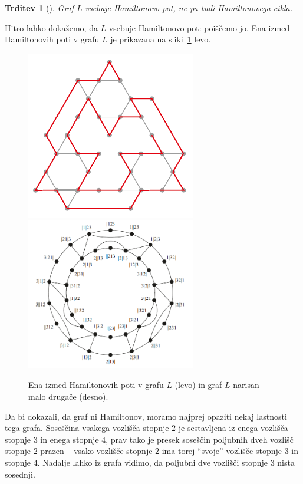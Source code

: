 \documentclass[12pt,a4paper]{amsart}
\theoremstyle{definition} %
\theoremstyle{plain} %
\newtheorem{trditev}[definicija]{Trditev}
\begin{document}
\bigskip

\begin{trditev}[{\cite[Proposition~7.1.]{bib:tohmyths}}]
    Graf $L$ vsebuje Hamiltonovo pot, ne pa tudi Hamiltonovega cikla.
\end{trditev}

\proof
    Hitro lahko dokažemo, da $L$ vsebuje Hamiltonovo pot: poiščemo jo. Ena izmed Hamiltonovih poti v grafu $L$ je prikazana na sliki~\ref{fig:dokaz-ham-klasicni} levo.
    
    \begin{figure}
        \includegraphics[width=210pt]{img/tolgraph-ham-path.png}
        \includegraphics[width=210pt]{img/tolgraph-ham-cycle.png}
        \caption{Ena izmed Hamiltonovih poti v grafu $L$ (levo) in graf $L$ narisan malo drugače (desno).}
        \label{fig:dokaz-ham-klasicni}
    \end{figure}
    
    Da bi dokazali, da graf ni Hamiltonov, moramo najprej opaziti nekaj lastnosti tega grafa. Soseščina vsakega vozlišča stopnje $2$ je sestavljena iz enega vozlišča stopnje $3$ in enega stopnje $4$, prav tako je presek soseščin poljubnih dveh vozlišč stopnje $2$ prazen -- vsako vozlišče stopnje $2$ ima torej ``svoje'' vozlišče stopnje $3$ in stopnje $4$. Nadalje lahko iz grafa vidimo, da poljubni dve vozlišči stopnje $3$ nista sosednji.
    
\end{document}
